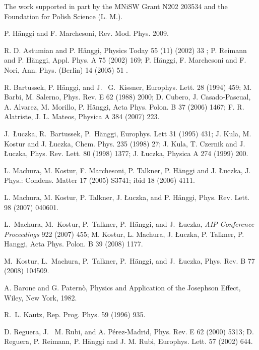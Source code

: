 \documentclass[a4,twocolumn,showpacs,showkeys]{revtex4}
\begin{document}
\begin{acknowledgments}
\noindent The work supported in part  by the MNiSW Grant
N202 203534 and the Foundation for Polish Science (L. M.).
\end{acknowledgments}


\begin{thebibliography}{99}

 P. H\"anggi and F. Marchesoni, Rev. Mod. Phys. 2009. 

 R. D. Astumian and P.
H\"anggi, Physics Today 55 (11) (2002) 33 ;  P. Reimann and P. H\"anggi,
Appl. Phys. A  75 (2002) 169; P. H\"anggi, F. Marchesoni  and F.
Nori, Ann. Phys. (Berlin)  14 (2005) 51 .

 R. Bartussek, P. H\"anggi, and J.~ G.~Kissner,
Europhys. Lett.  28 (1994) 459; 
M. Barbi, M. Salerno,  Phys. Rev. E 62  (1988) 2000;  
D. Cubero, J.  Casado-Pascual, A.  Alvarez, M.  Morillo, P.  H\"anggi,  Acta Phys. Polon. 
 B 37 (2006) 1467;  
F. R.  Alatriste,  J. L.  Mateos, Physica A  384 (2007)  223. 

 J.~{\L}uczka, R.~Bartussek, P.~H\"anggi, Europhys. Lett   31 (1995) 431;
J.  Kula, M. Kostur and J. \L uczka,  Chem. Phys.  235 (1998) 27;
 J. Kula, T. Czernik and J.  {\L}uczka,  Phys. Rev. Lett.    80 (1998) 1377;
J. \L uczka,  Physica A  274 (1999) 200.


 L. Machura, M. Kostur, F. Marchesoni, P. Talkner,
  P. H\"anggi and J.  {\L}uczka, J. Phys.: Condens. Matter  17 (2005)
  S3741; ibid 18  (2006) 4111.

 L. Machura, M. Kostur, P. Talkner, J. {\L}uczka,
and P. H\"anggi, Phys. Rev. Lett.  98 (2007) 040601.

L.~Machura, M.~Kostur, P.~Talkner, P.~H\"anggi, and J.~{\L}uczka,
\emph{AIP Conference Proceedings} 922 (2007) 455; 
M. Kostur, L. Machura, J. {\L}uczka, P. Talkner, P. Hanggi,  Acta Phys. Polon. B 39 (2008) 1177. 

M.~Kostur, L.~Machura, P.~Talkner, P.~H\"anggi, and J.~{\L}uczka,
Phys. Rev. B  77 (2008) 104509. 

 A. Barone and G. Patern\`o,  Physics and
    Application of the Josephson Effect, Wiley, New York, 1982.

 R.~L. Kautz, Rep. Prog. Phys. 59 (1996) 935.

 D. Reguera, J.~ M. Rubi, and A. P\'erez-Madrid, Phys.
  Rev. E  62 (2000) 5313; D. Reguera, P. Reimann, P. H\"anggi
  and J. M. Rubi, Europhys. Lett.  57 (2002) 644.


\end{thebibliography}
\end{document}
